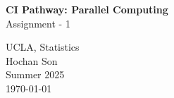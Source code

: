 \documentclass[11pt]{article}
\begin{document}





\newif\ifuselocaldir
\uselocaldirtrue
\uselocaldirfalse


\newcommand{\DXZ}{
\begin{flushright}
\vspace{-.4in}
 { \raisebox{0.30ex}{{\tiny D}}\hspace{0.008in}X\hspace{0.01in}\raisebox{0.30ex}{{\tiny Z}}     }
\end{flushright}
}


\newenvironment{myQuote}[2]%
               {\begin{list}{}{\leftmargin#1\rightmargin#2}\item{}}%
               {\end{list}}

\begin{myQuote}{2cm}{2cm}
\begin{center}
{\huge
\textbf{CI Pathway: Parallel Computing} \\[0.4cm]
Assignment - 1
} \\[0.4cm]
\end{center}
\end{myQuote}




\begin{myQuote}{3cm}{3cm}
{\normalsize
\begin{center}
UCLA, Statistics\\Hochan Son\\Summer 2025\\
\today
\end{center}
}
\end{myQuote}


\end{document}
